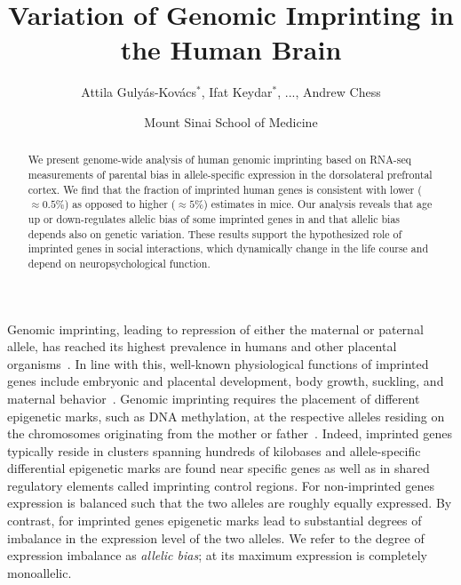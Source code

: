 \documentclass[letterpaper]{article}
\title{Variation of Genomic Imprinting in the Human Brain}
\author{Attila Guly\'{a}s-Kov\'{a}cs\(^\ast\), Ifat Keydar\(^\ast\),
...,
Andrew Chess}
\date{Mount Sinai School of Medicine}
\begin{document}
\maketitle

\begin{abstract}
We present 
genome-wide analysis of human genomic imprinting based on
RNA-seq measurements of 
parental bias in allele-specific expression in the
dorsolateral prefrontal cortex.  We find that the fraction of imprinted human
genes is consistent with lower (\(\approx 0.5\%\)) as opposed to higher
(\(\approx 5\%\)) estimates in mice.  Our analysis reveals that age up or
down-regulates allelic bias of some imprinted genes
 in 
and
that allelic bias depends also on genetic variation.
These results support the
hypothesized role of imprinted genes in social interactions, which dynamically
change in the life course and depend on neuropsychological function.
\end{abstract}

\section{}

Genomic imprinting, leading to repression of either the maternal or paternal
allele, has reached its highest prevalence in humans and other placental
organisms~\cite{Renfree2012}.  In line with this, well-known physiological
functions of imprinted genes include embryonic and placental development, body
growth, suckling, and maternal behavior~\cite{Plasschaert2014,Peters2014}.
Genomic imprinting requires the placement of different epigenetic marks, such
as DNA methylation, at the respective alleles residing on the chromosomes
originating from the mother or father~\cite{Plasschaert2014}.  Indeed,
imprinted genes typically reside in clusters spanning hundreds of kilobases
and allele-specific differential epigenetic marks are found near specific
genes as well as in shared regulatory elements called imprinting control
regions. For non-imprinted genes expression is balanced such that the two
alleles are roughly equally expressed. By contrast, for imprinted genes
epigenetic marks lead to substantial\deleted{,} degrees of
imbalance in the expression level of the two alleles.  We refer to the degree
of expression imbalance as \emph{allelic bias}; at its maximum expression is
completely monoallelic.
\end{document}
